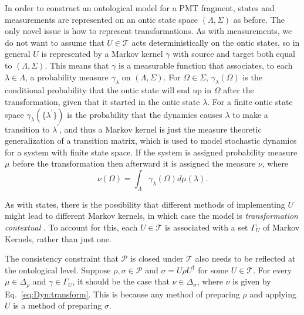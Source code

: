 \documentclass[DIV=calc,paper=a4,fontsize=11pt,twocolumn]{scrartcl} %
\theoremstyle{definition}
\theoremstyle{plain}
\begin{document}
In order to construct an ontological model for a PMT fragment, states
and measurements are represented on an ontic state space $(\Lambda,
\Sigma)$ as before.  The only novel issue is how to represent
transformations.  As with measurements, we do not want to assume that
$U \in \mathcal{T}$ acts deterministically on the ontic states, so in
general $U$ is represented by a Markov kernel $\gamma$ with source and
target both equal to $(\Lambda,\Sigma)$.  This means that $\gamma$ is
a measurable function that associates, to each $\lambda \in \Lambda$,
a probability measure $\gamma_{\lambda}$ on $(\Lambda,\Sigma)$.  For
$\Omega \in \Sigma$, $\gamma_{\lambda}(\Omega)$ is the conditional
probability that the ontic state will end up in $\Omega$ after the
transformation, given that it started in the ontic state $\lambda$.
For a finite ontic state space
$\gamma_{\lambda}(\{\lambda^{\prime}\})$ is the probability that the
dynamics causes $\lambda$ to make a transition to $\lambda^{\prime}$,
and thus a Markov kernel is just the measure theoretic generalization
of a transition matrix, which is used to model stochastic dynamics for
a system with finite state space.  If the system is assigned
probability measure $\mu$ before the transformation then afterward it
is assigned the measure $\nu$, where
\begin{equation}
\label{eq:Dyn:transform}
\nu(\Omega) = \int_{\Lambda} \gamma_{\lambda}(\Omega) d\mu(\lambda).
\end{equation}

As with states, there is the possibility that different methods of
implementing $U$ might lead to different Markov kernels, in which case
the model is \emph{transformation contextual} \cite{Spekkens2005}.  To
account for this, each $U \in \mathcal{T}$ is associated with a set
$\Gamma_{U}$ of Markov Kernels, rather than just one.

The consistency constraint that $\mathcal{P}$ is closed under
$\mathcal{T}$ also needs to be reflected at the ontological level.
Suppose $\rho, \sigma \in \mathcal{P}$ and $\sigma = U \rho
U^{\dagger}$ for some $U \in \mathcal{T}$.  For every $\mu \in
\Delta_{\rho}$ and $\gamma \in \Gamma_U$, it should be the case that
$\nu \in \Delta_{\sigma}$, where $\nu$ is given by
Eq.~\eqref{eq:Dyn:transform}.  This is because any method of preparing
$\rho$ and applying $U$ is a method of preparing $\sigma$.
\end{document}
